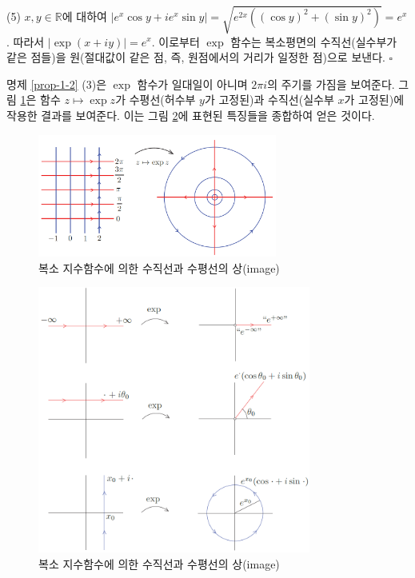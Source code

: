 \noindent
(5) $x,y \in \mathbb R$에 대하여
$|e^x \cos y + ie^x\sin y| = \sqrt{e^{2x}((\cos y)^2 + (\sin y)^2)} = e^x$.
따라서 $|\exp(x+iy)| = e^x$.
이로부터 $\exp$ 함수는 복소평면의 수직선(실수부가 같은 점들)을
원(절대값이 같은 점, 즉, 원점에서의 거리가 일정한 점)으로 보낸다.
\hfill $\square$

명제 \ref{prop-1-2} (3)은 $\exp$ 함수가 일대일이 아니며
$2\pi i$의 주기를 가짐을 보여준다.
그림 \ref{fig-1-16}은 함수 $z\mapsto \exp z$가
수평선(허수부 $y$가 고정된)과 수직선(실수부 $x$가 고정된)에 작용한 결과를 보여준다.
이는 그림 \ref{fig-1-17}에 표현된 특징들을 종합하여 얻은 것이다.

\begin{figure}[!h]
\begin{center}
\includegraphics[width=0.7\textwidth]{./SaltChapter/figs/fig-1-16}
\end{center}
\caption{복소 지수함수에 의한 수직선과 수평선의 상(image)}
\label{fig-1-16}
\end{figure}

\begin{figure}[!h]
\begin{center}
\includegraphics[width=0.8\textwidth]{./SaltChapter/figs/fig-1-17}
\end{center}
\caption{복소 지수함수에 의한 수직선과 수평선의 상(image)}
\label{fig-1-17}
\end{figure}

